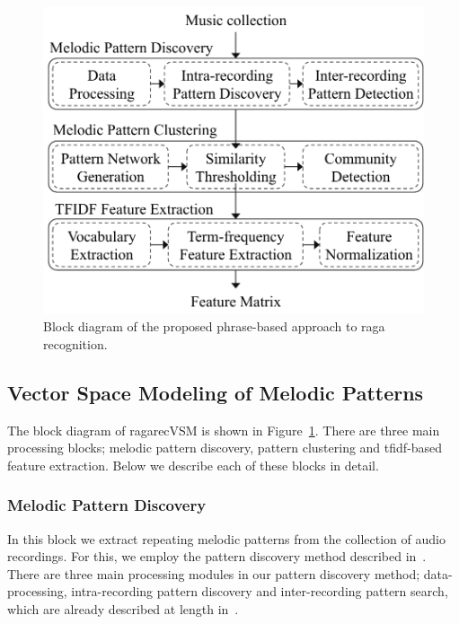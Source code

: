 \begin{figure}
	\begin{center}
		\includegraphics[width=\figSizeSeventy]{ch07_ragaRecognition/figures/bd_phasebased_raga_recognition.pdf}
	\end{center}
	\caption{Block diagram of the proposed phrase-based approach to \gls{raga} recognition.}
	\label{fig:bd_phasebased_raga_recognition}
\end{figure}


\subsection{Vector Space Modeling of Melodic Patterns}
\label{sec:vsm_feature_extraction}

The block diagram of \acrshort{ragarecVSM} is shown in Figure~\ref{fig:bd_phasebased_raga_recognition}. There are three main processing blocks; melodic pattern discovery, pattern clustering and \gls{tfidf}-based feature extraction. Below we describe each of these blocks in detail. 

\subsubsection{Melodic Pattern Discovery}
\label{sec:vsm_feature_extraction_pattern_discovery}

In this block we extract repeating melodic patterns from the collection of audio recordings. For this, we employ the pattern discovery method described in~. There are three main processing modules in our pattern discovery method; data-processing, intra-recording pattern discovery and inter-recording pattern search,  which are already described at length in~. 

